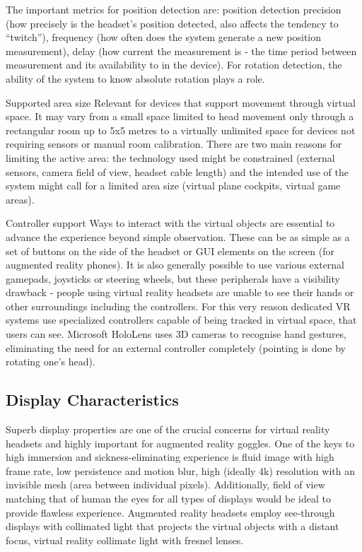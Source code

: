 \documentclass[12pt, a4paper]{article}
\newenvironment{definitions}
{\begin{description}[style=nextline]}
{\end{description}}
\begin{document}
\begin{definitions}
The important metrics for position detection are: position detection precision (how precisely is the headset’s position detected, also affects the tendency to “twitch”), frequency (how often does the system generate a new position measurement), delay (how current the measurement is - the time period between measurement and its availability to in the device). For rotation detection, the ability of the system to know absolute rotation plays a role.
\item[Supported area size] Relevant for devices that support movement through virtual space. It may vary from a small space limited to head movement only through a rectangular room up to 5x5 metres to a virtually unlimited space for devices not requiring sensors or manual room calibration. There are two main reasons for limiting the active area: the technology used might be constrained (external sensors, camera field of view, headset cable length) and the intended use of the system might call for a limited area size (virtual plane cockpits, virtual game areas).
\item[Controller support] Ways to interact with the virtual objects are essential to advance the experience beyond simple observation. These can be as simple as a set of buttons on the side of the headset or GUI elements on the screen (for augmented reality phones). It is also generally possible to use various external gamepads, joysticks or steering wheels, but these peripherals have a visibility drawback - people using virtual reality headsets are unable to see their hands or other surroundings including the controllers. For this very reason dedicated VR systems use specialized controllers capable of being tracked in virtual space, that users can see. Microsoft HoloLens uses 3D cameras to recognise hand gestures, eliminating the need for an external controller completely (pointing is done by rotating one’s head).
\end{definitions}

\subsection{Display Characteristics}
Superb display properties are one of the crucial concerns for virtual reality headsets and highly important for augmented reality goggles. One of the keys to high immersion and sickness-eliminating experience is fluid image with high frame rate, low persistence and motion blur, high (ideally 4k) resolution with an invisible mesh (area between individual pixels). Additionally, field of view matching that of human the eyes for all types of displays would be ideal to provide flawless experience. Augmented reality headsets employ see-through displays with collimated light that projects the virtual objects with a distant focus, virtual reality collimate light with fresnel lenses.
\end{document}
